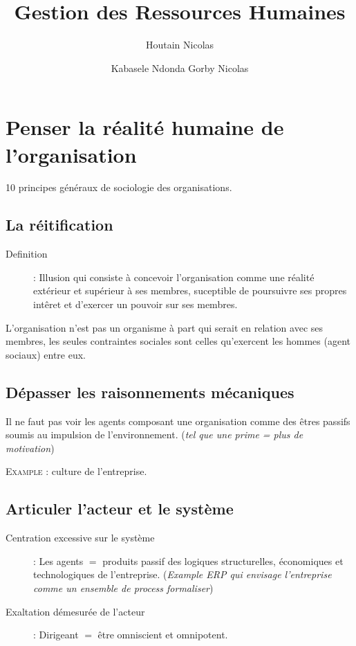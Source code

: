 \documentclass[11pt]{article} %
\title{Gestion des Ressources Humaines}
\author{Houtain Nicolas \and Kabasele Ndonda Gorby Nicolas}
\begin{document}
\maketitle

\section{Penser la réalité humaine de l'organisation}

10 principes généraux de sociologie des organisations.

\subsection{La réitification}
\begin{description}
    \item[Definition]   :    Illusion   qui   consiste    à   concevoir
l'organisation  comme  une réalité  extérieur  et  supérieur à  ses
membres, suceptible de  poursuivre ses propres intêret  et d'exercer un
pouvoir sur ses membres.
\end{description}

L'organisation n'est  pas un  organisme à part  qui serait  en relation
avec  ses   membres,  les   seules  contraintes  sociales   sont  celles
qu'exercent les hommes (agent sociaux) entre eux.


\subsection{Dépasser les raisonnements mécaniques} Il ne faut pas voir
les agents composant une organisation comme des êtres passifs soumis au
impulsion  de l'environnement.  (\textit{tel  que une  prime  = plus  de
motivation})

\textsc{Example} : culture de l'entreprise.


\subsection{Articuler l'acteur et le système}

\begin{description}
    \item[Centration   excessive  sur   le   système]   :  Les   agents
$=$  produits   passif  des  logiques  structurelles,   économiques  et
technologiques  de  l'entreprise.   (\textit{Example  ERP  qui  envisage
l'entreprise comme un ensemble de process formaliser})

     \item[Exaltation  démesurée de  l'acteur] :  Dirigeant $=$  être
     omniscient et omnipotent.
\end{description}
\end{document}
